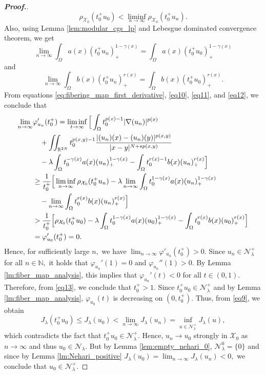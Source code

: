 \documentclass[11pt]{article}
\newcommand{\X}{\mathcal{X}_{0}}
\newcommand{\Nh}{\mathcal{N}_\la}
\newcommand{\rh}{\rho_{\X}}
\newcommand{\lmt}{\lim_{n\to\infty}}
\newcommand{\ga} {\gamma}
\newcommand{\om} {\Omega}
\newcommand{\la} {\lambda}
\newcommand{\ds} {\displaystyle}
\newcommand{\grad}{\nabla}
\begin{document}
\begin{proof}[\bf Proof.]
\begin{equation}
    \rh(t_0^+u_0)< \liminf_{n\to\infty} 
    \rh(t_0^+u_n).
\end{equation}
Also, using Lemma \ref{lem:modular_cgs_lp} 
and Lebesgue dominated convergence theorem, 
we get
\begin{equation}\label{eq11}
    \lim_{n\to\infty}
\int_\om a(x)(t_0^+u_n)_+^{1-\ga(x)}=
\int_\om a(x)(t_0^+u_0)_+^{1-\ga(x)}
  \end{equation}
and 
\begin{equation}\label{eq12}
    \lim_{n\to\infty}
\int_\om b(x)(t_0^+u_n)_+^{r(x)}=
\int_\om b(x)(t_0^+u_0)_+^{r(x)}.
  \end{equation}
From equations 
\eqref{eq:fibering_map_first_derivative}, 
\eqref{eq10}, \eqref{eq11}, and 
\eqref{eq12}, 
we conclude that
    \begin{align} \label{eq13}
\lmt & \varphi'_{u_n}(t_0^+)
 =\liminf_{t\to\infty}\Big [
\int_\om t_0^{p(x)-1}|\grad 
(u_n)|^{p(x)} \notag \\
        &\quad
+\iint_{\mathbb{R}^{2N}}
 t_0^{p(x,y)-1}
\frac{|(u_n)(x)-(u_n)(y)|^{p(x,y)}}
{|x-y|^{N+sp(x,y)}}\Big .\nonumber\\
        &\quad -\la
\int_\om t_0^{-\ga(x)}a(x)(u_n)_+^{1-\ga(x)}
        -
\int_\om t_0^{r(x)-1}b(x)(u_n)_+^{r(x)}
\Big ]\nonumber\\
       &\ge
\frac{1}{t_0^+}\Big [\liminf_{n\to\infty}
\rh(t_0^+u_n)-\la\lmt
\int_\om t_0^{1-\ga(x)}a(x)(u_n)_+^{1-\ga(x)}
 \nonumber\\
        &\quad -\lmt
\int_\om t_0^{r(x)}b(x)(u_n)_+^{r(x)}
\Big ]\nonumber\\
        &>
\frac{1}{t_0^+}\Big [\rh(t_0^+u_0)-\la
\int_\om t_0^{1-\ga(x)}a(x)(u_0)_+^{1-\ga(x)}-
\int_\om t_0^{r(x)}b(x)(u_0)_+^{r(x)}
\Big ]\nonumber\\
        &=\varphi'_{u_0}(t_0^+)=0.
    \end{align}
Hence, for sufficiently large $n,$
we have $\ds \lmt \varphi'_{u_n}(t_0^+)>0.$
Since $u_n\in \Nh^+$
for all $n\in\mathbb{N},$
it holds that $\varphi_{u_n}'(1)=0$
and $\varphi_{u_n}''(1)>0.$
By Lemma \ref{lm:fiber_map_analysis}, 
this implies that $\varphi_{u_n}'(t)<0$
for all $t\in (0,1).$
Therefore, from \eqref{eq13}, 
we conclude that $t_0^+>1.$
Since $t_0^+u_0\in\Nh^+$
and by Lemma \ref{lm:fiber_map_analysis}, 
$\varphi_{u_0}(t)$
is decreasing on $(0,t_0^+).$
Thus, from \eqref{eq9}, we obtain
$$
J_\la(t_0^+u_0)\le J_\la(u_0)<\lmt 
J_\la(u_n)=\inf_{u\in\Nh^+}J_\la(u),
$$
which contradicts the fact that 
$t_0^+u_0\in\Nh^+.$
Hence, $u_n\rightarrow u_0$
strongly in $\X$
as $n\to\infty$
and thus $u_0\in\Nh.$
But by Lemma \ref{lem:empty_nehari_0}, 
$\Nh^0=\{0\}$
and since by Lemma 
\ref{lm:Nehari_positive} 
$J_\la(u_0)=\ds \lmt J_\la(u_n)<0,$
we conclude that $u_0\in\Nh^+.$
\end{proof}
\end{document}

